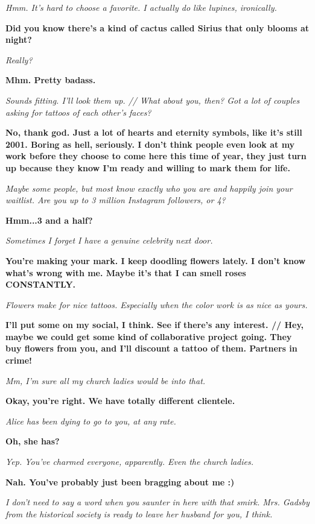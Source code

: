 \textit{Hmm. It’s hard to choose a favorite. I actually do like lupines, ironically.
}

\textbf{Did you know there’s a kind of cactus called Sirius that only blooms at night?
}

\textit{Really?
}

\textbf{Mhm. Pretty badass.
}

\textit{Sounds fitting. I’ll look them up. // What about you, then? Got a lot of couples asking for tattoos of each other’s faces?
}

\textbf{No, thank god. Just a lot of hearts and eternity symbols, like it’s still 2001. Boring as hell, seriously. I don’t think people even look at my work before they choose to come here this time of year, they just turn up because they know I’m ready and willing to mark them for life.
}

\textit{Maybe some people, but most know exactly who you are and happily join your waitlist. Are you up to 3 million Instagram followers, or 4?
}

\textbf{Hmm...3 and a half?
}

\textit{Sometimes I forget I have a genuine celebrity next door.
}

\textbf{You’re making your mark. I keep doodling flowers lately. I don’t know what’s wrong with me. Maybe it’s that I can smell roses CONSTANTLY.
}

\textit{Flowers make for nice tattoos. Especially when the color work is as nice as yours.
}

\textbf{I’ll put some on my social, I think. See if there’s any interest. // Hey, maybe we could get some kind of collaborative project going. They buy flowers from you, and I’ll discount a tattoo of them. Partners in crime!
}

\textit{Mm, I’m sure all my church ladies would be into that.
}

\textbf{Okay, you’re right. We have totally different clientele.
}

\textit{Alice has been dying to go to you, at any rate.
}

\textbf{Oh, she has?
}

\textit{Yep. You’ve charmed everyone, apparently. Even the church ladies.
}

\textbf{Nah. You’ve probably just been bragging about me :)
}

\textit{I don’t need to say a word when you saunter in here with that smirk. Mrs. Gadsby from the historical society is ready to leave her husband for you, I think.
}

